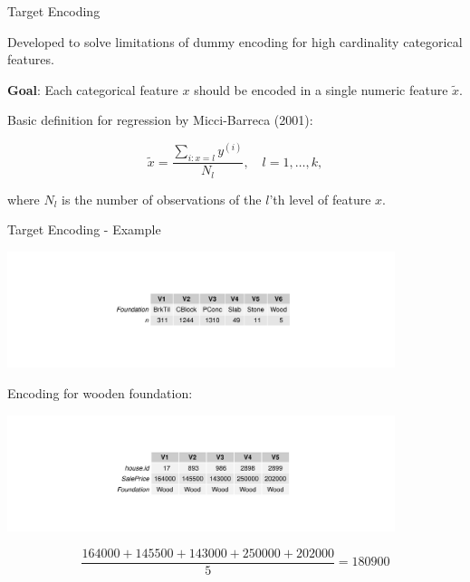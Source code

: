 \documentclass[11pt,compress,t,notes=noshow, xcolor=table]{beamer}
\begin{document}

\begin{vbframe}{Target Encoding}

Developed to solve limitations of dummy encoding for high cardinality categorical features.

\textbf{Goal}: Each categorical feature $x$ should be encoded in a single numeric feature $\tilde x$.

Basic definition for regression by Micci-Barreca (2001):

$$\tilde x = \frac{\sum_{i:x=l}y^{(i)}}{N_l}, \quad l=1,\dots,k,$$

where $N_l$ is the number of observations of the $l$'th level of feature $x$.

\end{vbframe}


\begin{vbframe}{Target Encoding - Example}


\includegraphics[width = 0.85\textwidth]{figure/foundation_counts_table.pdf}


Encoding for wooden foundation:


\includegraphics[width = 0.85\textwidth]{figure/wood_foundation_examples.pdf}

\[
\dfrac{164000 + 145500 + 143000 + 250000 + 202000}{5} = 180900
\]


\end{vbframe}

\end{document}
